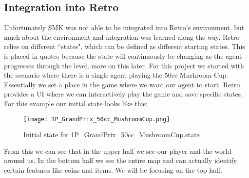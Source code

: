 \subsection{Integration into Retro}
Unfortunately SMK was not able to be integrated into Retro's environment, but
much about the environment and integration was learned along the way.
Retro relies on different ``states", which can be defined as different 
starting states. 
This is placed in quotes because the state will continuously be changing as
the agent progresses through the level, more on this later. For
this project we started with the scenario where there is a single agent
playing the 50cc Mushroom Cup. Essentially we set a place in the game where we
want our agent to start. Retro provides a UI where we can interactively play
the game and save specific states. For this example our initial state looks like
this:
\begin{figure}[h!]
    \centering
    \texttt{[image: 1P\_GrandPrix\_50cc\_MushroomCup.png]}
    \caption{Initial state for 1P\_GrandPrix\_50cc\_MushroomCup.state}
\end{figure}
\FloatBarrier
From this we can see that in the upper half we see our player and the world
around us. In the bottom half we see the entire map and can actually identify 
certain features like coins and items. We will be focusing on the top half.

